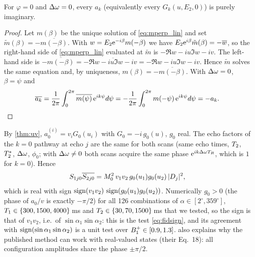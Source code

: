 \begin{lemma}\label{lem:imag}
For $\varphi=0$ and $\Delta\omega=0$, every $a_k$ (equivalently every $G_k(u,E_2,0)$) is purely imaginary.
\end{lemma}
\begin{proof}
Let $m(\beta)$ be the unique solution of \eqref{eq:mperp_lin} and set $\tilde m(\beta)=-\overline{m(-\beta)}$.
With $w=E_2\mathrm{e}^{-i\beta}m(-\beta)$ we have $E_2\mathrm{e}^{i\beta}\tilde m(\beta)=-\overline w$, so the right-hand side of
\eqref{eq:mperp_lin} evaluated at $\tilde m$ is $-\Re w-iu\Im w-iv$. The left-hand side is
$-\overline{m(-\beta)}=-\overline{\Re w-iu\Im w-iv}=-\Re w-iu\Im w-iv$. Hence $\tilde m$ solves the same
equation and, by uniqueness, $m(\beta)=-\overline{m(-\beta)}$. With $\Delta\omega=0$, $\beta=\psi$ and
\[
  \overline{a_k}=\frac{1}{2\pi}\int_0^{2\pi}\overline{m(\psi)}\,\mathrm{e}^{ik\psi}d\psi
  =-\frac{1}{2\pi}\int_0^{2\pi}m(-\psi)\,\mathrm{e}^{ik\psi}d\psi=-a_k .
\]
\end{proof}

By \cref{thm:uv}, $a_0^{(i)}=v_iG_0(u_i)$ with $G_0=-i\,g_0(u)$, $g_0$ real. The echo factors of the
$k=0$ pathway at echo $j$ are the same for both scans (same echo times, $T_2$, $T_2^{*}$, $\Delta\omega$,
$\phi_0$; with $\Delta\omega\ne0$ both scans acquire the same phase $\mathrm{e}^{ik\Delta\omega T_R}$, which is $1$ for $k=0$).
Hence
\[
  S_{1j0}\overline{S_{2j0}}=M_0^2\,v_1v_2\,g_0(u_1)g_0(u_2)\,|D_j|^2,
\]
which is real with sign $\operatorname{sign}(v_1v_2)\,\operatorname{sign}(g_0(u_1)g_0(u_2))$. Numerically $g_0>0$ (the phase of
$a_0/v$ is exactly $-\pi/2$) for all 126 combinations of $\alpha\in[2^\circ,359^\circ]$,
$T_1\in\{300,1500,4000\}$\,ms and $T_2\in\{30,70,1500\}$\,ms that we tested, so the sign is that of
$v_1v_2$, i.e.\ of $\sin\alpha_1\sin\alpha_2$: this is the test \eqref{eq:fidsign}, and its agreement with
$\operatorname{sign}(\sin\alpha_1\sin\alpha_2)$ is a unit test over $B_1^{+}\in[0.9,1.3]$.  also explains why the
published method can work with real-valued states (their Eq.~18): all configuration amplitudes
share the phase $\pm\pi/2$.
